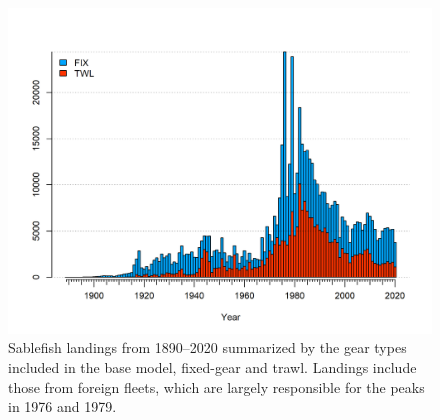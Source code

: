 \documentclass[11pt,
  english,
  a4paper,
]{article}
\begin{document}
\leavevmode\tagmcend\tagstructend\par


\begin{figure}
\centering
\includegraphics[width=1\textwidth,height=1\textheight]{figs/catch2 landings stacked.png}
\caption{Sablefish landings from 1890--2020 summarized by the gear types included in the base model, fixed-gear and trawl. Landings include those from foreign fleets, which are largely responsible for the peaks in 1976 and 1979.\label{fig:catches}}
\end{figure}

\tagmcend\tagstructend

\begingroup\fontsize{10}{12}\selectfont
\begingroup\fontsize{10}{12}\selectfont
\end{document}
